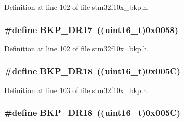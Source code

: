 Definition at line 102 of file stm32f10x\+\_\+bkp.\+h.

\subsubsection[{\texorpdfstring{B\+K\+P\+\_\+\+D\+R17}{BKP_DR17}}]{\setlength{\rightskip}{0pt plus 5cm}\#define B\+K\+P\+\_\+\+D\+R17~(({\bf uint16\+\_\+t})0x0058)}\hypertarget{group___data___backup___register_ga2d7c7e1c601b0313e60d876560a34329}{}\label{group___data___backup___register_ga2d7c7e1c601b0313e60d876560a34329}


Definition at line 102 of file stm32f10x\+\_\+bkp.\+h.

\subsubsection[{\texorpdfstring{B\+K\+P\+\_\+\+D\+R18}{BKP_DR18}}]{\setlength{\rightskip}{0pt plus 5cm}\#define B\+K\+P\+\_\+\+D\+R18~(({\bf uint16\+\_\+t})0x005\+C)}\hypertarget{group___data___backup___register_ga43856bf6f92d07ffea0f96f5243ed8a2}{}\label{group___data___backup___register_ga43856bf6f92d07ffea0f96f5243ed8a2}


Definition at line 103 of file stm32f10x\+\_\+bkp.\+h.

\subsubsection[{\texorpdfstring{B\+K\+P\+\_\+\+D\+R18}{BKP_DR18}}]{\setlength{\rightskip}{0pt plus 5cm}\#define B\+K\+P\+\_\+\+D\+R18~(({\bf uint16\+\_\+t})0x005\+C)}\hypertarget{group___data___backup___register_ga43856bf6f92d07ffea0f96f5243ed8a2}{}\label{group___data___backup___register_ga43856bf6f92d07ffea0f96f5243ed8a2}


